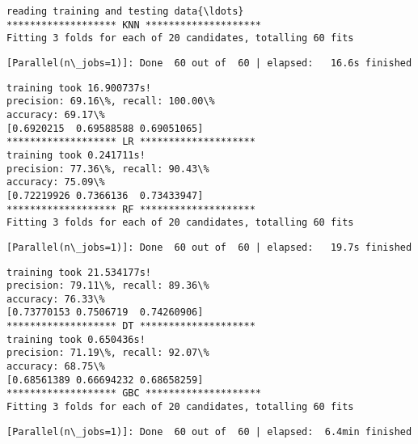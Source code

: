 \documentclass[11pt]{article}
\begin{document}
    \begin{Verbatim}[commandchars=\\\{\}]
reading training and testing data{\ldots}
******************* KNN ********************
Fitting 3 folds for each of 20 candidates, totalling 60 fits

    \end{Verbatim}

    \begin{Verbatim}[commandchars=\\\{\}]
[Parallel(n\_jobs=1)]: Done  60 out of  60 | elapsed:   16.6s finished

    \end{Verbatim}

    \begin{Verbatim}[commandchars=\\\{\}]
training took 16.900737s!
precision: 69.16\%, recall: 100.00\%
accuracy: 69.17\%
[0.6920215  0.69588588 0.69051065]
******************* LR ********************
training took 0.241711s!
precision: 77.36\%, recall: 90.43\%
accuracy: 75.09\%
[0.72219926 0.7366136  0.73433947]
******************* RF ********************
Fitting 3 folds for each of 20 candidates, totalling 60 fits

    \end{Verbatim}

    \begin{Verbatim}[commandchars=\\\{\}]
[Parallel(n\_jobs=1)]: Done  60 out of  60 | elapsed:   19.7s finished

    \end{Verbatim}

    \begin{Verbatim}[commandchars=\\\{\}]
training took 21.534177s!
precision: 79.11\%, recall: 89.36\%
accuracy: 76.33\%
[0.73770153 0.7506719  0.74260906]
******************* DT ********************
training took 0.650436s!
precision: 71.19\%, recall: 92.07\%
accuracy: 68.75\%
[0.68561389 0.66694232 0.68658259]
******************* GBC ********************
Fitting 3 folds for each of 20 candidates, totalling 60 fits

    \end{Verbatim}

    \begin{Verbatim}[commandchars=\\\{\}]
[Parallel(n\_jobs=1)]: Done  60 out of  60 | elapsed:  6.4min finished

    \end{Verbatim}
\end{document}
